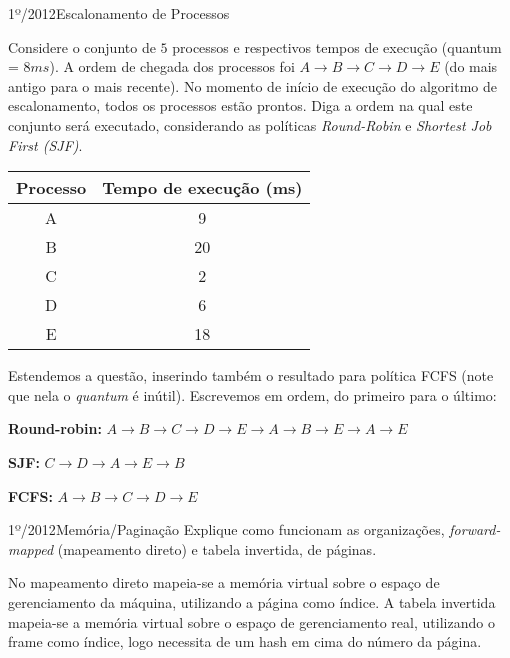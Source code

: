 \begin{exercicio}
  {1º/2012}{Escalonamento de Processos}
  {Considere o conjunto de $5$ processos e respectivos tempos de execução (quantum = $8 ms$). A ordem de chegada dos processos foi $A \rightarrow B \rightarrow C \rightarrow D \rightarrow E$ (do mais antigo para o mais recente). No momento de início de execução do algoritmo de escalonamento, todos os processos estão prontos. Diga a ordem na qual este conjunto será executado, considerando as políticas \textit{Round-Robin} e \textit{Shortest Job First (SJF)}.
  \begin{table}[!H]
      \centering
      \begin{tabular}{cc}
        \hline \hline
        \textbf{Processo} & \textbf{Tempo de execução (ms)} \\ \hline
        A                 & 9                               \\
        B                 & 20                              \\
        C                 & 2                               \\
        D                 & 6                               \\
        E                 & 18                              \\
        \hline \hline
      \end{tabular}
    \end{table}
  }


    Estendemos a questão, inserindo também o resultado para política FCFS (note que nela o \textit{quantum} é inútil). Escrevemos em ordem, do primeiro para o último:

    \textbf{Round-robin:} $A \rightarrow B \rightarrow C \rightarrow D \rightarrow E \rightarrow A \rightarrow B \rightarrow E \rightarrow A \rightarrow E$

    \textbf{SJF:} $C \rightarrow D \rightarrow A \rightarrow E \rightarrow B$

    \textbf{FCFS:} $A \rightarrow B \rightarrow C \rightarrow D \rightarrow E$
\end{exercicio}

\begin{exercicio}
  {1º/2012}{Memória/Paginação}
  {Explique como funcionam as organizações, \textit{forward-mapped} (mapeamento direto) e tabela invertida, de páginas.}

  No mapeamento direto mapeia-se a memória virtual sobre o espaço de gerenciamento da máquina, utilizando a página como índice.
  A tabela invertida mapeia-se a memória virtual sobre o espaço de gerenciamento real, utilizando o frame como índice, logo necessita de um hash em cima do número da página.
\end{exercicio}

